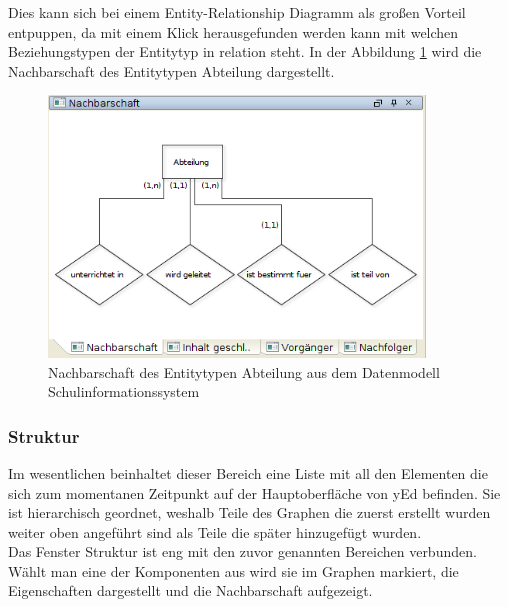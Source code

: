 \noindent
Dies kann sich bei einem Entity-Relationship Diagramm als großen Vorteil entpuppen, da mit einem Klick herausgefunden werden kann mit welchen Beziehungstypen der Entitytyp in relation steht. In der Abbildung \ref{yEdNachbarschaft} wird die Nachbarschaft des Entitytypen Abteilung dargestellt.

\begin{figure}[!h]
	\begin{center}
		\includegraphics[width=10cm]{images/yed_nachbarschaft.png}
		\caption{Nachbarschaft des Entitytypen Abteilung aus dem Datenmodell Schulinformationssystem}
		\label{yEdNachbarschaft}
	\end{center}
\end{figure}

\subsubsection{Struktur}
\prc
Im wesentlichen beinhaltet dieser Bereich eine Liste mit all den Elementen die sich zum momentanen Zeitpunkt auf der Hauptoberfläche von yEd befinden. Sie ist hierarchisch geordnet, weshalb Teile des Graphen die zuerst erstellt wurden weiter oben angeführt sind als Teile die später hinzugefügt wurden. 
\\

\noindent
Das Fenster Struktur ist eng mit den zuvor genannten Bereichen verbunden. Wählt man eine der Komponenten aus wird sie im Graphen markiert, die Eigenschaften dargestellt und die Nachbarschaft aufgezeigt.

